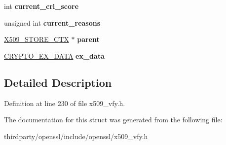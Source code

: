 \begin{DoxyCompactItemize}
int {\bfseries current\+\_\+crl\+\_\+score}
\item 
\mbox{\label{structx509__store__ctx__st_ae2ab9b215c63995eaef346e6a1fde845}} 
unsigned int {\bfseries current\+\_\+reasons}
\item 
\mbox{\label{structx509__store__ctx__st_a647b1547f675fde39774de2672fdbf69}} 
\hyperlink{structx509__store__ctx__st}{X509\+\_\+\+S\+T\+O\+R\+E\+\_\+\+C\+TX} $\ast$ {\bfseries parent}
\item 
\mbox{\label{structx509__store__ctx__st_a30a9b2bc4ea6479c2ce84b1a169cedd4}} 
\hyperlink{structcrypto__ex__data__st}{C\+R\+Y\+P\+T\+O\+\_\+\+E\+X\+\_\+\+D\+A\+TA} {\bfseries ex\+\_\+data}
\end{DoxyCompactItemize}


\subsection{Detailed Description}


Definition at line 230 of file x509\+\_\+vfy.\+h.



The documentation for this struct was generated from the following file\+:\begin{DoxyCompactItemize}
\item 
thirdparty/openssl/include/openssl/x509\+\_\+vfy.\+h\end{DoxyCompactItemize}
